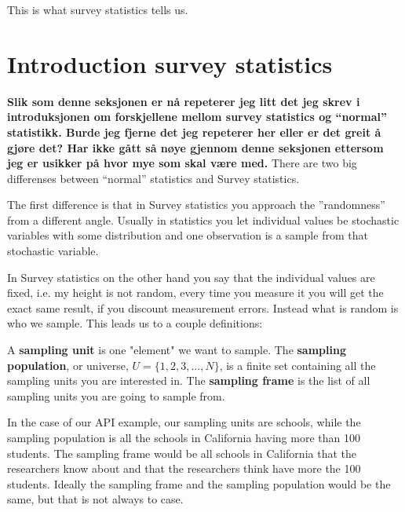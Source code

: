 \documentclass{article}
\begin{document}
This is what survey statistics tells us.

\section{Introduction survey statistics}

\textbf{Slik som denne seksjonen er nå repeterer jeg litt det jeg skrev i
  introduksjonen om forskjellene mellom survey statistics og ``normal''
  statistikk. Burde jeg fjerne det jeg repeterer her eller er det greit å gjøre
  det?
Har ikke gått så nøye gjennom denne seksjonen ettersom jeg er usikker på hvor
mye som skal være med.}
There are two big differenses between ``normal'' statistics and Survey statistics.

The first difference is that in Survey statistics you approach the ''randomness'' from a different angle.
Usually in statistics you let individual values be stochastic variables
with some distribution and one observation is a sample from that stochastic
variable.

In Survey statistics on the other hand you say that the individual values are
fixed, i.e. my height is not random, every time you measure it you will get the
exact same result, if you discount measurement errors. Instead what is random is
who we sample. This leads us to a couple definitions:

\begin{definition} \label{def:sampUnitPopFrame}
  A \textbf{sampling unit} is one "element" we want to sample.
  The \textbf{sampling population}, or universe, \(U = \{1, 2, 3, ..., N\}\), is a
  finite set containing all the sampling units you are interested in. 
  The \textbf{sampling frame} is the list of all sampling units you are going to sample from. 
\end{definition}

In the case of our API example, our sampling units are schools, while
the sampling population is all the schools in California having more than 100 students.
The sampling frame would be all schools in California that the researchers know
about and that the researchers think have more the 100 students.
Ideally the sampling frame and the sampling population would be the same, but that is not always to case.
\end{document}
